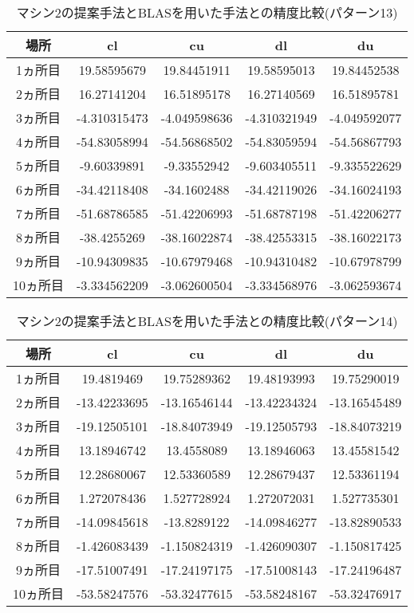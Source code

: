 \documentclass[11pt,a4paper]{jsreport}
\theoremstyle{definition}
\begin{document}
\begin{table}[H]
\centering
\begin{tabular}{|c|c|c|c|c|}
\hline
場所 & cl & cu & dl & du \\ \hline
1ヵ所目 & 19.58595679 & 19.84451911 & 19.58595013 & 19.84452538 \\ \hline
2ヵ所目 & 16.27141204 & 16.51895178 & 16.27140569 & 16.51895781 \\ \hline
3ヵ所目 & -4.310315473 & -4.049598636 & -4.310321949 & -4.049592077 \\ \hline
4ヵ所目 & -54.83058994 & -54.56868502 & -54.83059594 & -54.56867793 \\ \hline
5ヵ所目 & -9.60339891 & -9.33552942 & -9.603405511 & -9.335522629 \\ \hline
6ヵ所目 & -34.42118408 & -34.1602488 & -34.42119026 & -34.16024193 \\ \hline
7ヵ所目 & -51.68786585 & -51.42206993 & -51.68787198 & -51.42206277 \\ \hline
8ヵ所目 & -38.4255269 & -38.16022874 & -38.42553315 & -38.16022173 \\ \hline
9ヵ所目 & -10.94309835 & -10.67979468 & -10.94310482 & -10.67978799 \\ \hline
10ヵ所目 & -3.334562209 & -3.062600504 & -3.334568976 & -3.062593674 \\ \hline
\end{tabular}
\caption{マシン2の提案手法とBLASを用いた手法との精度比較(パターン13)}
\end{table}

\begin{table}[H]
\centering
\begin{tabular}{|c|c|c|c|c|}
\hline
場所 & cl & cu & dl & du \\ \hline
1ヵ所目 & 19.4819469 & 19.75289362 & 19.48193993 & 19.75290019 \\ \hline
2ヵ所目 & -13.42233695 & -13.16546144 & -13.42234324 & -13.16545489 \\ \hline
3ヵ所目 & -19.12505101 & -18.84073949 & -19.12505793 & -18.84073219 \\ \hline
4ヵ所目 & 13.18946742 & 13.4558089 & 13.18946063 & 13.45581542 \\ \hline
5ヵ所目 & 12.28680067 & 12.53360589 & 12.28679437 & 12.53361194 \\ \hline
6ヵ所目 & 1.272078436 & 1.527728924 & 1.272072031 & 1.527735301 \\ \hline
7ヵ所目 & -14.09845618 & -13.8289122 & -14.09846277 & -13.82890533 \\ \hline
8ヵ所目 & -1.426083439 & -1.150824319 & -1.426090307 & -1.150817425 \\ \hline
9ヵ所目 & -17.51007491 & -17.24197175 & -17.51008143 & -17.24196487 \\ \hline
10ヵ所目 & -53.58247576 & -53.32477615 & -53.58248167 & -53.32476917 \\ \hline
\end{tabular}
\caption{マシン2の提案手法とBLASを用いた手法との精度比較(パターン14)}
\end{table}
\end{document}
